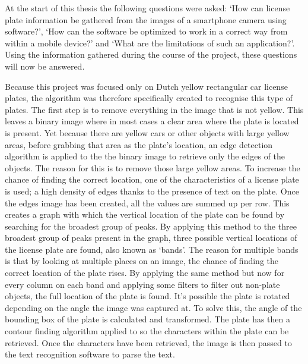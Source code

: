 
At the start of this thesis the following questions were asked: `How can license plate information be gathered from the images of a smartphone camera using software?', `How can the software be optimized to work in a correct way from within a mobile device?' and `What are the limitations of such an application?'. Using the information gathered during the course of the project, these questions will now be answered.


Because this project was focused only on Dutch yellow rectangular car license plates, the algorithm was therefore specifically created to recognise this type of plates. The first step is to remove everything in the image that is not yellow. This leaves a binary image where in most cases a clear area where the plate is located is present. Yet because there are yellow cars or other objects with large yellow areas, before grabbing that area as the plate's location, an edge detection algorithm is applied to the the binary image to retrieve only the edges of the objects. The reason for this is to remove those large yellow areas. To increase the chance of finding the correct location, one of the characteristics of a license plate is used; a high density of edges thanks to the presence of text on the plate. Once the edges image has been created, all the values are summed up per row. This creates a graph with which the vertical location of the plate can be found by searching for the broadest group of peaks. By applying this method to the three broadest group of peaks present in the graph, three possible vertical locations of the license plate are found, also known as `bands'. The reason for multiple bands is that by looking at multiple places on an image, the chance of finding the correct location of the plate rises. By applying the same method but now for every column on each band and applying some filters to filter out non-plate objects, the full location of the plate is found. It's possible the plate is rotated depending on the angle the image was captured at. To solve this, the angle of the bounding box of the plate is calculated and transformed. The plate has then a contour finding algorithm applied to so the characters within the plate can be retrieved. Once the characters have been retrieved, the image is then passed to the text recognition software to parse the text.

